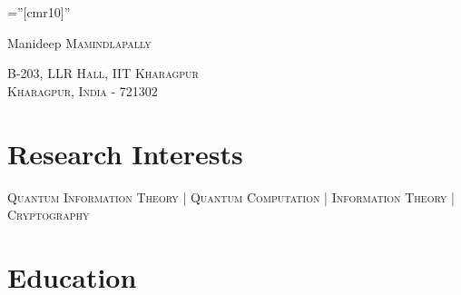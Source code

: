 \documentclass[a4paper,10pt]{article}
\def \siteurl{https://manideepmamindlapally.github.io}
\begin{document}


\pagestyle{empty} %

\font\fb=''[cmr10]'' %


\par{\centering
		{\Huge Manideep \textsc{Mamindlapally}
	}\par}



\par{\centering
		{ \textsc{B-203, LLR Hall, IIT Kharagpur\\ Kharagpur, India - 721302}\\
		}\par
	}
	
	\par{ \centering
\href{https://scholar.google.com/citations?hl=en&user=w-PmSxAAAAAJ}{\textcolor{black}{\faGraduationCap}}
\href{https://github.com/manideepmamindlapally}{\textcolor{black}{\faGithubSquare}}
\href{https://www.linkedin.com/in/manideep-mamindlapally}{\textcolor{black}{\faLinkedin}}
\href{\siteurl}{\textcolor{black}{\faGlobe}}
\href{https://twitter.com/manideepyx}{\textcolor{black}{\faTwitter}}
\href{mailto:manideepyx@iitkgp.ac.in}{\textcolor{black}{\faEnvelope}}
\href{tel:+919515399302}{\textcolor{black}{\faPhoneSquare*}}
\par}

\section{Research Interests}
\centering
\textsc{Quantum Information Theory} | \textsc{Quantum Computation} | \textsc{Information Theory} | \textsc{Cryptography}
\section{Education}
\end{document}
